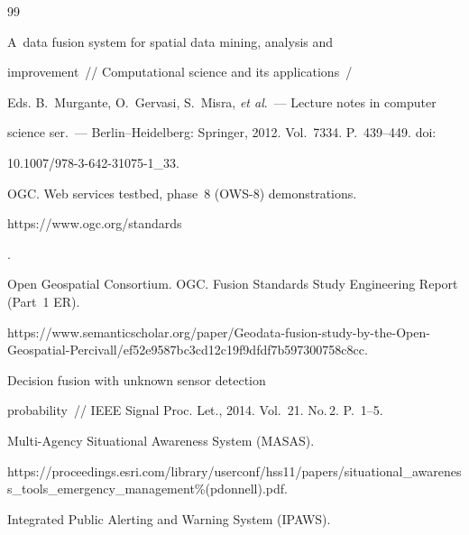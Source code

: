 {\small\frenchspacing


{%




\begin{thebibliography}{99}




 A~data fusion system for spatial data mining, analysis and 


improvement~/\!\!/ Computational science and its applications~/


Eds. B.~Murgante, O.~Gervasi, S.~Misra, \textit{et al}.~--- Lecture notes in computer 


science ser.~--- Berlin--Heidelberg: Springer, 2012. Vol.~7334. P.~439--449.  doi:  


10.1007/978-3-642-31075-1\_33.







OGC. Web services testbed, phase~8 (OWS-8) demonstrations. {\sf 


https://www.ogc.org/\linebreak standards}.




Open Geospatial Consortium. OGC. Fusion Standards Study Engineering Report (Part~1 ER). 


 {\sf  


https://www.semanticscholar.org/paper/Geodata-fusion-study-by-the-Open-Geospatial-Percivall/ef52e9587bc3cd12c19f9dfdf7b597300758c8cc.}




 Decision fusion with unknown sensor detection 


probability~/\!\!/ IEEE Signal Proc. Let., 2014. Vol.~21. No.\,2. P.~1--5.




Multi-Agency Situational Awareness System (MASAS). {\sf 


https://proceedings.esri.com/\linebreak library/userconf/hss11/papers/situational\_awareness\_tools\_emergency\_management\%(pdonnell).pdf.}




Integrated Public Alerting and Warning System (IPAWS). 



\end{thebibliography}}}
